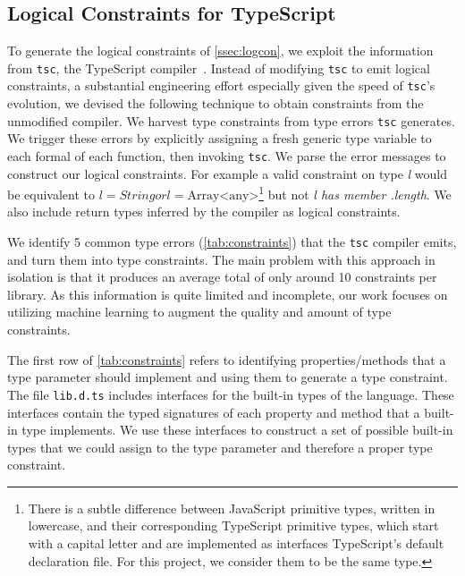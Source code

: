 \documentclass[sigplan,10pt,review,anonymous]{acmart} %
\newcommand{\margincomment}[2]{\marginpar{\scriptsize\color{Maroon}#1 says: #2}}
\newcommand{\adg}[1]{\margincomment{ADG}{#1}}
\theoremstyle{plain}
\theoremstyle{remark}
\theoremstyle{definition}
\begin{document}
\subsection{Logical Constraints for TypeScript}\label{ssec:logprodts}

To generate the logical constraints of \cref{ssec:logcon}, we exploit the information from \lstinline+tsc+, the TypeScript compiler~\cite{typescript}.
%
Instead of modifying \lstinline+tsc+ to emit logical constraints, a substantial
engineering effort especially given the speed of \lstinline+tsc+'s evolution,
we devised the following technique to obtain constraints from the unmodified compiler.
%
We harvest type constraints from type errors \lstinline+tsc+ generates.  We trigger
these errors by explicitly assigning a fresh generic type variable to
each formal of each function, then invoking \lstinline+tsc+.
%
We parse the error messages to construct our logical constraints.
%
\adg{this example is rather out of context}
For example a valid constraint on type \textit{l} would be equivalent to
$l = String \mathrel{or} l = \text{Array<any>}$\footnote{There is a subtle
difference between JavaScript primitive types, written in lowercase, and their
corresponding TypeScript primitive types, which start with a capital letter and
are implemented as interfaces TypeScript's default declaration file. For this
project, we consider them to be the same type.} but not \textit{l has member .length}.
%
We also include return types inferred by the compiler as logical constraints.
%

We identify 5 common type errors (\cref{tab:constraints}) that the \texttt{tsc}
compiler emits, and turn them into type constraints. The main problem with 
this approach in isolation is that it produces an average total
of only around 10 constraints per library. As this information is quite
limited and incomplete, our work focuses on utilizing machine learning to augment
the quality and amount of type constraints.

The first row of \cref{tab:constraints}
refers to identifying properties/methods that a type parameter should implement
and using them to generate a type constraint.
The file \lstinline{lib.d.ts} includes interfaces for the built-in types of the language.
These interfaces contain the typed signatures of each property and method
that a built-in type implements. We use these interfaces to construct a set of
possible built-in types that we could assign to the type parameter and therefore a proper
type constraint. 
\end{document}
